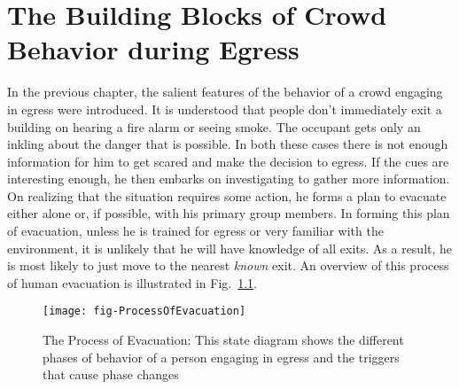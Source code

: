 
\chapter{The Building Blocks of Crowd Behavior during Egress}
\label{chapter:IBEVAC}

In the previous chapter, the salient features of the behavior of a crowd engaging in egress were introduced. It is understood that people don't immediately exit a building on hearing a fire alarm or seeing smoke. The occupant gets only an inkling about the danger that is possible. In both these cases there is not enough information for him to get scared and make the decision to egress. If the cues are interesting enough, he then embarks on investigating to gather more information. On realizing that the situation requires some action, he forms a plan to evacuate either alone or, if possible, with his primary group members. In forming this plan of evacuation, unless he is trained for egress or very familiar with the environment, it is unlikely that he will have knowledge of all exits. As a result, he is most likely to just move to the nearest \emph{known} exit. An overview of this process of human evacuation is illustrated in Fig.~\ref{fig:EvacuationProcess}.
\begin{figure}[!htb]
\centering
\texttt{[image: fig-ProcessOfEvacuation]}
\caption[The Process of Evacuation]{The Process of Evacuation: This state diagram shows the different phases of behavior of a person engaging in egress and the triggers that cause phase changes}
\label{fig:EvacuationProcess}
\end{figure}

